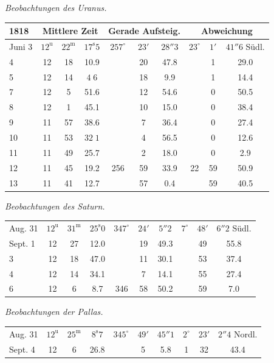 \begin{center}
\emph{Beobachtungen des Uranus.}

\setlength{\tabcolsep}{2.2pt}\begin{tabular}{l|ccc|ccc|ccc}
1818 & \multicolumn{3}{c|}{Mittlere Zeit} & \multicolumn{3}{c|}{Gerade Aufsteig.} & \multicolumn{3}{c}{Abweichung} \\
\hline
Juni 3 & $12^{\mathrm u}$ & $22^{\mathrm m}$ & $17^{\mathrm s}5$ & $257^\circ$ & $23'$ & $28''3$ & $23^\circ$ & $1'$ & $41''6$ Südl. \\ 
4 & 12 & 18 & 10.9 & & 20 & 47.8 & & 1 & 29.0 \\
5 & 12 & 14 & $4\;6$ & & 18 & 9.9 & & 1 & 14.4 \\
7 & 12 & 5 & 51.6 & & 12 & 54.6 & & 0 & 50.5 \\ 
8 & 12 & 1 & 45.1 & & 10 & 15.0 & & 0 & 38.4 \\
9 & 11 & 57 & 38.6 & & 7 & 36.4 & & 0 & 27.4 \\
10 & 11 & 53 & $32\;1$ & & 4 & 56.5 & & 0 & 12.6 \\
11 & 11 & 49 & 25.7 & & 2 & 18.0 & & 0 & 2.9 \\
12 & 11 & 45 & 19.2 & 256 & 59 & 33.9 & 22 & 59 & 50.9 \\
13 & 11 & 41 & 12.7 & & 57 & 0.4 & & 59 & 40.5 \\
\end{tabular}
\end{center}

\begin{center}
\emph{Beobachtungen des Saturn.}

\setlength{\tabcolsep}{2.2pt}\begin{tabular}{l|ccc|ccc|ccc}
Aug. 31 & $12^{\mathrm u}$ & $31^{\mathrm m}$ & $25^{\mathrm s}0$ & $347^\circ$ & $24'$ & $5''2$ & $7^\circ$ & $48'$ & $6''2$ Südl. \\
Sept. 1 & 12 & 27 & 12.0 & & 19 & 49.3 & & 49 & 55.8 \\
3 & 12 & 18 & 47.0 & & 11 & 30.1 & & 53 & 37.4 \\
4 & 12 & 14 & 34.1 & & 7 & 14.1 & & 55 & 27.4 \\
6 & 12 & 6 & 8.7 & 346 & 58 & 50.2 & & 59 & 7.0 \\
\end{tabular}
\end{center}

\begin{center}
\emph{Beobachtungen der Pallas.}

\setlength{\tabcolsep}{2.2pt}\begin{tabular}{l|ccc|ccc|ccc}
Aug. 31 & $12^{\mathrm u}$ & $25^{\mathrm m}$ & $8^{\mathrm s}7$ & $345^\circ$ & $49'$ & $45''1$ & $2^\circ$ & $23'$ & $2''4$ Nordl. \\
Sept. 4 & 12 & 6 & 26.8 & & 5 & 5.8 & 1 & 32 & 43.4 \\
\end{tabular}
\end{center}

